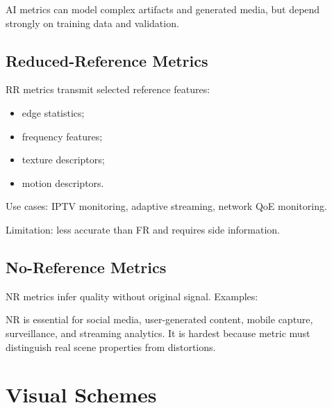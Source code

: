 AI metrics can model complex artifacts and generated media, but depend strongly on training data and validation.

\subsection{Reduced-Reference Metrics}

RR metrics transmit selected reference features:

\begin{itemize}
  \item edge statistics;
  \item frequency features;
  \item texture descriptors;
  \item motion descriptors.
\end{itemize}

Use cases: IPTV monitoring, adaptive streaming, network QoE monitoring.

Limitation: less accurate than FR and requires side information.

\subsection{No-Reference Metrics}

NR metrics infer quality without original signal. Examples:

\begin{center}
\end{center}

NR is essential for social media, user-generated content, mobile capture, surveillance, and streaming analytics. It is hardest because metric must distinguish real scene properties from distortions.

\section{Visual Schemes}

